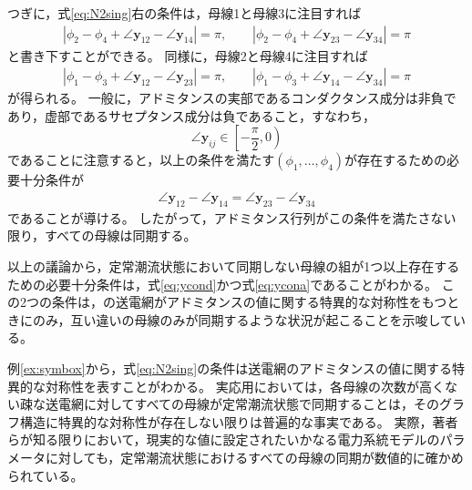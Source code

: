 \documentclass[tombow,dvipdfmx]{corona-a5-1.1}
\begin{document}
\begin{例}
つぎに，式\ref{eq:N2sing}右の条件は，母線1と母線3に注目すれば
\begin{align*}
|\phi_2 - \phi_4 + \angle \bm{y}_{12} - \angle \bm{y}_{14}|=\pi
,\qquad
|\phi_2 - \phi_4 + \angle \bm{y}_{23} - \angle \bm{y}_{34}|=\pi
\end{align*}
と書き下すことができる。
同様に，母線2と母線4に注目すれば
\begin{align*}
|\phi_1 - \phi_3 + \angle \bm{y}_{12} - \angle \bm{y}_{23}|=\pi
,\qquad
|\phi_1 - \phi_3 + \angle \bm{y}_{14} - \angle \bm{y}_{34}|=\pi
\end{align*}
が得られる。
一般に，アドミタンスの実部であるコンダクタンス成分は非負であり，虚部であるサセプタンス成分は負であること，すなわち，
\[
\angle \bm{y}_{ij} \in \left[-\frac{\pi}{2},0 \right)
\]
であることに注意すると，以上の条件を満たす$(\phi_1,\ldots,\phi_4)$が存在するための必要十分条件が
\begin{align}\label{eq:ycona}
\angle \bm{y}_{12} - \angle \bm{y}_{14}=
\angle \bm{y}_{23} - \angle \bm{y}_{34}
\end{align}
であることが導ける。
したがって，アドミタンス行列がこの条件を満たさない限り，すべての母線は同期する。

以上の議論から，定常潮流状態において同期しない母線の組が1つ以上存在するための必要十分条件は，式\ref{eq:ycond}かつ式\ref{eq:ycona}であることがわかる。
この2つの条件は，の送電網がアドミタンスの値に関する特異的な対称性をもつときにのみ，互い違いの母線のみが同期するような状況が起こることを示唆している。
\end{例}

例\ref{ex:symbox}から，式\ref{eq:N2sing}の条件は送電網のアドミタンスの値に関する特異的な対称性を表すことがわかる。
実応用においては，各母線の次数が高くない疎な送電網に対してすべての母線が定常潮流状態で同期することは，そのグラフ構造に特異的な対称性が存在しない限りは普遍的な事実である。
実際，著者らが知る限りにおいて，現実的な値に設定されたいかなる電力系統モデルのパラメータに対しても，定常潮流状態におけるすべての母線の同期が数値的に確かめられている。
\end{document}
